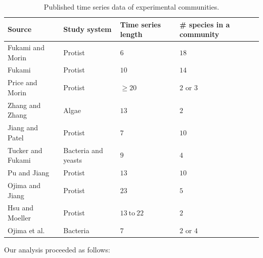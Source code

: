 \documentclass[12pt, class=article, crop=false]{standalone}
\begin{document}
\begin{table}
    \flushleft
    \caption{Published time series data of experimental communities.}
    \begin{tabular}{llll}
         Source & Study system & Time series length & \# species in a community\\
         \hline
         Fukami and Morin \citep{fukami_productivity-biodiversity_2003} & Protist & $6$ & $18$\\
         Fukami \citep{fukami_assembly_2004} & Protist & $10$ & $14$\\
         Price and Morin \citep{price_colonization_2004} & Protist & $\ge 20$ & $2$ or $3$ \\
         Zhang and Zhang \citep{zhang_colonization_2007} & Algae & $13$ & $2$\\
         Jiang and Patel \citep{jiang_community_2008} & Protist & $7$ & $10$\\
         Tucker and Fukami \citep{tucker_environmental_2014} & Bacteria and yeasts & $9$ & $4$\\
         Pu and Jiang \citep{pu_dispersal_2015} & Protist & $13$ & $10$\\
         Ojima and Jiang \citep{ojima_interactive_2017} & Protist & $23$ & $5$\\
         Hsu and Moeller \citep{hsu_metabolic_2021} & Protist & $13~\mbox{to}~22$ & $2$\\
         Ojima et al. \citep{ojima_priority_2022} & Bacteria & $7$ & $2$ or $4$\\
         \hline
    \end{tabular}
    \label{tab:expdata}
\end{table}

Our analysis proceeded as follows:
\end{document}
